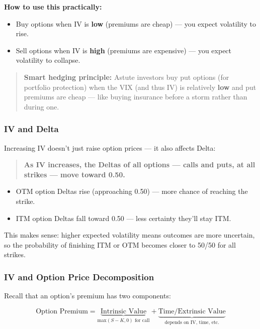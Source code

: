 \documentclass[12pt,openany]{book}
\begin{document}
\textbf{How to use this practically:}
\begin{itemize}[leftmargin=*]
    \item Buy options when IV is \textbf{low} (premiums are cheap) — you expect volatility to rise.
    \item Sell options when IV is \textbf{high} (premiums are expensive) — you expect volatility to collapse.
\end{itemize}

\begin{quote}
\textbf{Smart hedging principle:} Astute investors buy put options (for portfolio protection) when the VIX (and thus IV) is relatively \textbf{low} and put premiums are cheap — like buying insurance before a storm rather than during one.
\end{quote}

\subsubsection{IV and Delta}

Increasing IV doesn't just raise option prices — it also affects Delta:

\begin{quote}
\textbf{As IV increases, the Deltas of all options — calls and puts, at all strikes — move toward 0.50.}
\end{quote}

\begin{itemize}[leftmargin=*]
    \item OTM option Deltas rise (approaching 0.50) — more chance of reaching the strike.
    \item ITM option Deltas fall toward 0.50 — less certainty they'll stay ITM.
\end{itemize}

This makes sense: higher expected volatility means outcomes are more uncertain, so the probability of finishing ITM or OTM becomes closer to 50/50 for all strikes.

\subsubsection{IV and Option Price Decomposition}

Recall that an option's premium has two components:

\[
\text{Option Premium} = \underbrace{\text{Intrinsic Value}}_{\text{max}(S-K, 0) \text{ for call}} + \underbrace{\text{Time/Extrinsic Value}}_{\text{depends on IV, time, etc.}}
\]
\end{document}
